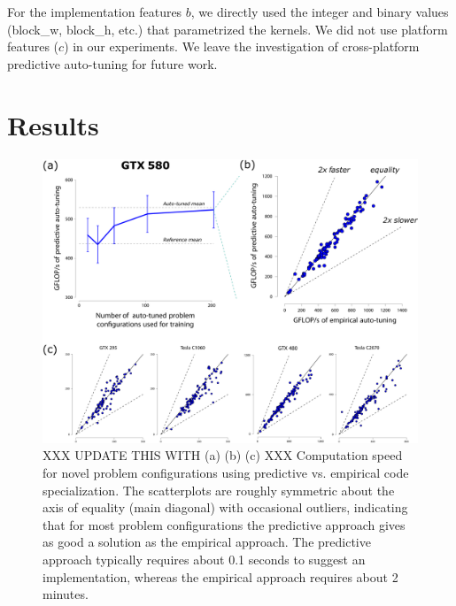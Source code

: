 \documentclass{sig-alternate}
\begin{document}
For the implementation features $b$, we directly used the integer and binary values (block\_w, block\_h, etc.) that parametrized the kernels.
We did not use platform features ($c$) in our experiments. We leave the investigation
of cross-platform predictive auto-tuning for future work.


\section{Results}

\begin{figure}[!ht]
\centering
\includegraphics[width=.9\linewidth]{illustrator/fig_main_R1.pdf}
\caption{
XXX UPDATE THIS WITH (a) (b) (c) XXX
Computation speed for novel problem configurations using predictive
vs. empirical code specialization.
The scatterplots are roughly symmetric about the axis of equality (main diagonal)
with occasional outliers, indicating that for most problem configurations the
predictive approach gives as good a solution as the empirical approach.
The predictive approach typically requires about 0.1 seconds to suggest an
implementation, whereas the empirical approach requires about 2 minutes.
}
\label{fig:fig_gflop_scatter}
\end{figure}
\end{document}
